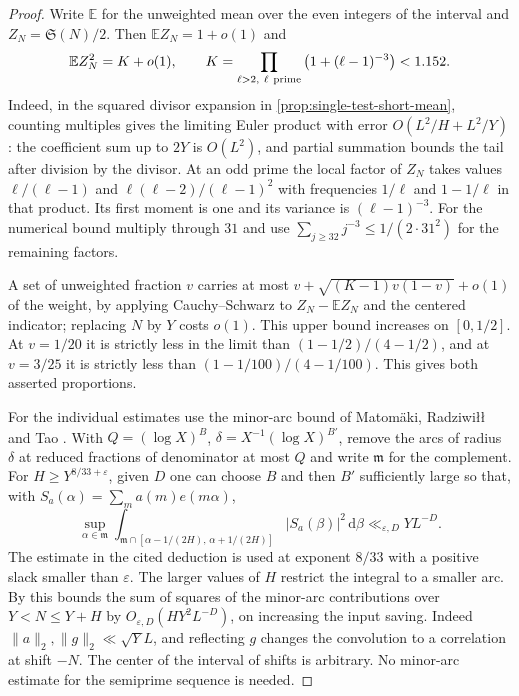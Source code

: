 \documentclass[11pt,a4paper]{article}
\numberwithin{equation}{section}
\newcommand{\SSS}{\mathfrak S}
\newcommand{\ud}{\mathrm d}
\begin{document}
\begin{proof}
Write $\mathbb E$ for the unweighted mean over the even integers
of the interval and $Z_N=\SSS(N)/2$. Then $\mathbb EZ_N=1+o(1)$ and
\[
 \mathbb EZ_N^2=K+o(1),\qquad
 K=\prod_{\ell>2,\ \ell\ {\rm prime}}\left(1+(\ell-1)^{-3}\right)
       <1.152.
\]
Indeed, in the squared divisor expansion in
\cref{prop:single-test-short-mean}, counting multiples gives
the limiting Euler product with error $O(L^2/H+L^2/Y)$:
the coefficient sum up to $2Y$ is $O(L^2)$, and partial summation
bounds the tail after division by the divisor. At an odd prime
the local factor of $Z_N$ takes values
$\ell/(\ell-1)$ and $\ell(\ell-2)/(\ell-1)^2$ with
frequencies $1/\ell$ and $1-1/\ell$ in that product.
Its first moment is one and its variance is $(\ell-1)^{-3}$.
For the numerical bound multiply through $31$ and use
$\sum_{j\ge32}j^{-3}\le1/(2\cdot31^2)$ for the remaining factors.

A set of unweighted fraction $v$ carries at most
$v+\sqrt{(K-1)v(1-v)}+o(1)$ of the weight, by applying
Cauchy--Schwarz to $Z_N-\mathbb EZ_N$ and the centered
indicator; replacing $N$ by $Y$ costs $o(1)$.
This upper bound increases on $[0,1/2]$. At $v=1/20$ it is
strictly less in the limit than $(1-1/2)/(4-1/2)$, and at
$v=3/25$ it is strictly less than $(1-1/100)/(4-1/100)$.
This gives both asserted proportions.

For the individual estimates use the minor-arc bound of
Matom\"aki, Radziwi\l\l{} and Tao
\cite[Proposition~3.4 and the deduction of Theorem~1.3]{MRTLong}.
With $Q=(\log X)^B$, $\delta=X^{-1}(\log X)^{B'}$, remove the
arcs of radius $\delta$ at reduced fractions of denominator
at most $Q$ and write $\mathfrak m$ for the complement.
For $H\ge Y^{8/33+\varepsilon}$, given $D$ one can choose $B$ and
then $B'$ sufficiently large so that, with $S_a(\alpha)=\sum_m
a(m)e(m\alpha)$,
\[
 \sup_{\alpha\in\mathfrak m}
 \int_{\mathfrak m\cap[\alpha-1/(2H),\,\alpha+1/(2H)]}
               |S_a(\beta)|^2\,\ud\beta\ll_{\varepsilon,D} YL^{-D}.
\]
The estimate in the cited deduction is used at exponent
$8/33$ with a positive slack smaller than $\varepsilon$.
The larger values of $H$ restrict the integral to a smaller arc.
By \cite[Corollary~3.2, proof]{MRTLong} this bounds the sum
of squares of the minor-arc contributions over $Y<N\le Y+H$
by $O_{\varepsilon,D}(HY^2L^{-D})$, on increasing the input
saving. Indeed $\|a\|_2,\|g\|_2\ll \sqrt Y L$, and reflecting
$g$ changes the convolution to a correlation at shift $-N$.
The center of the interval of shifts is arbitrary. No minor-arc
estimate for the semiprime sequence is needed.


\end{proof}
\end{document}
